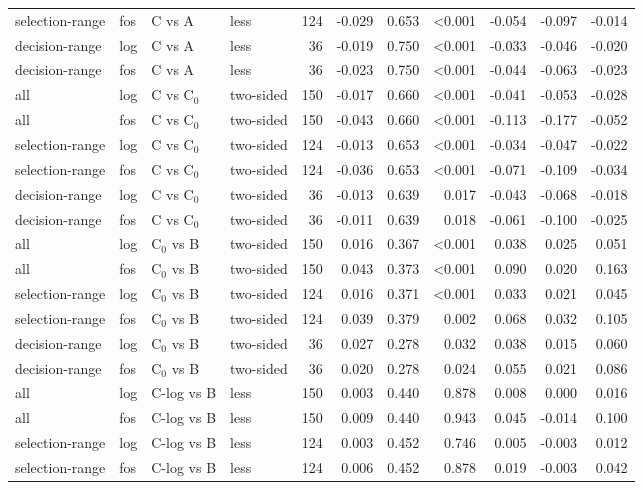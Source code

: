 \begin{longtable}{llllrrrrrrr}
selection-range & fos & C vs A & less & 124 & -0.029 & 0.653 & <0.001 & -0.054 & -0.097 & -0.014 \\
decision-range & log & C vs A & less & 36 & -0.019 & 0.750 & <0.001 & -0.033 & -0.046 & -0.020 \\
decision-range & fos & C vs A & less & 36 & -0.023 & 0.750 & <0.001 & -0.044 & -0.063 & -0.023 \\
all & log & C vs C$_0$ & two-sided & 150 & -0.017 & 0.660 & <0.001 & -0.041 & -0.053 & -0.028 \\
all & fos & C vs C$_0$ & two-sided & 150 & -0.043 & 0.660 & <0.001 & -0.113 & -0.177 & -0.052 \\
selection-range & log & C vs C$_0$ & two-sided & 124 & -0.013 & 0.653 & <0.001 & -0.034 & -0.047 & -0.022 \\
selection-range & fos & C vs C$_0$ & two-sided & 124 & -0.036 & 0.653 & <0.001 & -0.071 & -0.109 & -0.034 \\
decision-range & log & C vs C$_0$ & two-sided & 36 & -0.013 & 0.639 & 0.017 & -0.043 & -0.068 & -0.018 \\
decision-range & fos & C vs C$_0$ & two-sided & 36 & -0.011 & 0.639 & 0.018 & -0.061 & -0.100 & -0.025 \\
all & log & C$_0$ vs B & two-sided & 150 & 0.016 & 0.367 & <0.001 & 0.038 & 0.025 & 0.051 \\
all & fos & C$_0$ vs B & two-sided & 150 & 0.043 & 0.373 & <0.001 & 0.090 & 0.020 & 0.163 \\
selection-range & log & C$_0$ vs B & two-sided & 124 & 0.016 & 0.371 & <0.001 & 0.033 & 0.021 & 0.045 \\
selection-range & fos & C$_0$ vs B & two-sided & 124 & 0.039 & 0.379 & 0.002 & 0.068 & 0.032 & 0.105 \\
decision-range & log & C$_0$ vs B & two-sided & 36 & 0.027 & 0.278 & 0.032 & 0.038 & 0.015 & 0.060 \\
decision-range & fos & C$_0$ vs B & two-sided & 36 & 0.020 & 0.278 & 0.024 & 0.055 & 0.021 & 0.086 \\
all & log & C-log vs B & less & 150 & 0.003 & 0.440 & 0.878 & 0.008 & 0.000 & 0.016 \\
all & fos & C-log vs B & less & 150 & 0.009 & 0.440 & 0.943 & 0.045 & -0.014 & 0.100 \\
selection-range & log & C-log vs B & less & 124 & 0.003 & 0.452 & 0.746 & 0.005 & -0.003 & 0.012 \\
selection-range & fos & C-log vs B & less & 124 & 0.006 & 0.452 & 0.878 & 0.019 & -0.003 & 0.042 \\

\end{longtable}
